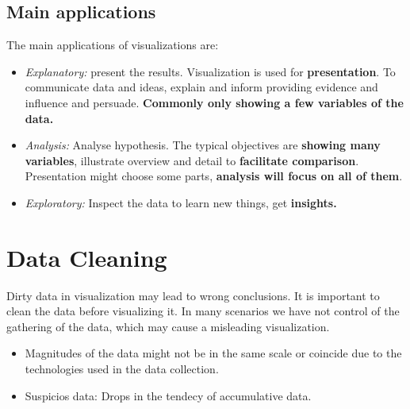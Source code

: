 \documentclass{article}
\begin{document}
\subsection{Main applications}
The main applications of visualizations are: 
\begin{itemize}
    \item \textit{Explanatory:} present the results. Visualization is used for \textbf{presentation}. To communicate data and ideas, explain and inform providing evidence and influence and persuade. \textbf{Commonly only showing a few variables of the data.}
    \item \textit{Analysis:} Analyse hypothesis. The typical objectives are \textbf{showing many variables}, illustrate overview and detail to \textbf{facilitate comparison}. Presentation might choose some parts, \textbf{analysis will focus on all of them}.
    \item \textit{Exploratory:} Inspect the data to learn new things, get \textbf{insights.}
\end{itemize}

\section{Data Cleaning}
Dirty data in visualization may lead to wrong conclusions. It is important to clean the data before visualizing it. In many scenarios we have not control of the gathering of the data, which may cause a misleading visualization.
\begin{itemize}
  \item Magnitudes of the data might not be in the same scale or coincide due to the technologies used in the data collection.
  \item Suspicios data: Drops in the tendecy of accumulative data.
\end{itemize}



\newpage
\end{document}
